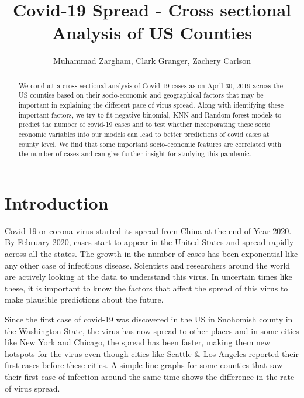 \documentclass[
]{article}
\title{Covid-19 Spread - Cross sectional Analysis of US Counties}
\author{Muhammad Zargham, Clark Granger, Zachery Carlson}
\date{}
\begin{document}
\maketitle

\begin{abstract}
We conduct a cross sectional analysis of Covid-19 cases as on April 30, 2019 across the US counties based on their socio-economic and geographical factors that may be important in explaining the different pace of virus spread. Along with identifying these important factors, we try to fit negative binomial, KNN and Random forest models to predict the number of covid-19 cases and to test whether incorporating these socio economic variables into our models can lead to better predictions of covid cases at county level. We find that some important socio-economic features are correlated with the number of cases and can give further insight for studying this pandemic.  
\end{abstract}
\newpage

{
\setcounter{tocdepth}{2}
\tableofcontents
}
\newpage

\hypertarget{introduction}{%
\section{Introduction}\label{introduction}}

Covid-19 or corona virus started its spread from China at the end of
Year 2020. By February 2020, cases start to appear in the United States
and spread rapidly across all the states. The growth in the number of
cases has been exponential like any other case of infectious disease.
Scientists and researchers around the world are actively looking at the
data to understand this virus. In uncertain times like these, it is
important to know the factors that affect the spread of this virus to
make plausible predictions about the future.

Since the first case of covid-19 was discovered in the US in Snohomish
county in the Washington State, the virus has now spread to other places
and in some cities like New York and Chicago, the spread has been
faster, making them new hotspots for the virus even though cities like
Seattle \& Los Angeles reported their first cases before these cities. A
simple line graphs for some counties that saw their first case of
infection around the same time shows the difference in the rate of virus
spread.
\end{document}
